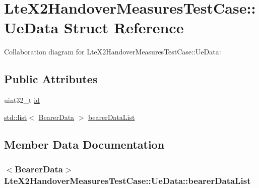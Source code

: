 \hypertarget{structLteX2HandoverMeasuresTestCase_1_1UeData}{}\section{Lte\+X2\+Handover\+Measures\+Test\+Case\+:\+:Ue\+Data Struct Reference}
\label{structLteX2HandoverMeasuresTestCase_1_1UeData}


Collaboration diagram for Lte\+X2\+Handover\+Measures\+Test\+Case\+:\+:Ue\+Data\+:
\subsection*{Public Attributes}
\begin{DoxyCompactItemize}
\item 
uint32\+\_\+t \hyperlink{structLteX2HandoverMeasuresTestCase_1_1UeData_a4d31c7069fe18297c00fc12575d4a7b6}{id}
\item 
\hyperlink{openflow-interface_8h_afd9bcfa176617760671b67580f536fa7}{std\+::list}$<$ \hyperlink{structLteX2HandoverMeasuresTestCase_1_1BearerData}{Bearer\+Data} $>$ \hyperlink{structLteX2HandoverMeasuresTestCase_1_1UeData_a670a316062770047eeaca464688b5dce}{bearer\+Data\+List}
\end{DoxyCompactItemize}


\subsection{Member Data Documentation}
\subsubsection[{\texorpdfstring{bearer\+Data\+List}{bearerDataList}}]{$<${\bf Bearer\+Data}$>$ Lte\+X2\+Handover\+Measures\+Test\+Case\+::\+Ue\+Data\+::bearer\+Data\+List}\hypertarget{structLteX2HandoverMeasuresTestCase_1_1UeData_a670a316062770047eeaca464688b5dce}{}\label{structLteX2HandoverMeasuresTestCase_1_1UeData_a670a316062770047eeaca464688b5dce}
